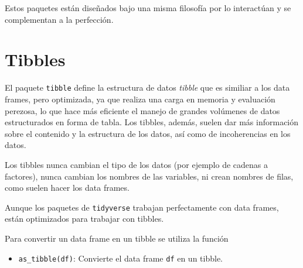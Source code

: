 \documentclass[
  a4paper,
]{scrreport}
\providecommand{\tightlist}{%
  \setlength{\itemsep}{0pt}\setlength{\parskip}{0pt}}\usepackage{longtable,booktabs,array}
\theoremstyle{definition}
\theoremstyle{definition}
\theoremstyle{remark}
\begin{document}
Estos paquetes están diseñados bajo una misma filosofía por lo
interactúan y se complementan a la perfección.

\hypertarget{tibbles}{%
\section{Tibbles}\label{tibbles}}

El paquete \texttt{tibble} define la estructura de datos \emph{tibble}
que es similiar a los data frames, pero optimizada, ya que realiza una
carga en memoria y evaluación perezosa, lo que hace más eficiente el
manejo de grandes volúmenes de datos estructurados en forma de tabla.
Los tibbles, además, suelen dar más información sobre el contenido y la
estructura de los datos, así como de incoherencias en los datos.

Los tibbles nunca cambian el tipo de los datos (por ejemplo de cadenas a
factores), nunca cambian los nombres de las variables, ni crean nombres
de filas, como suelen hacer los data frames.

Aunque los paquetes de \texttt{tidyverse} trabajan perfectamente con
data frames, están optimizados para trabajar con tibbles.

Para convertir un data frame en un tibble se utiliza la función

\begin{itemize}
\tightlist
\item
  \texttt{as\_tibble(df)}: Convierte el data frame \texttt{df} en un
  tibble.
\end{itemize}
\end{document}

